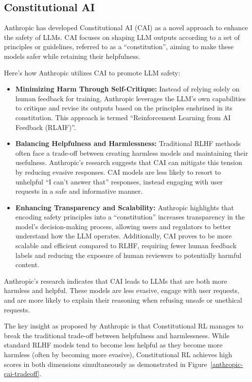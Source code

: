 \subsection{Constitutional AI}

Anthropic has developed Constitutional AI (CAI)  as a novel approach to enhance the safety of LLMs. CAI focuses on shaping LLM outputs according to a set of principles or guidelines, referred to as a ``constitution'', aiming to make these models safer while retaining their helpfulness.

Here's how Anthropic utilizes CAI to promote LLM safety:

\begin{itemize}
    \item \textbf{Minimizing Harm Through Self-Critique:} Instead of relying solely on human feedback for training, Anthropic leverages the LLM's own capabilities to critique and revise its outputs based on the principles enshrined in its constitution. This approach is termed ``Reinforcement Learning from AI Feedback (RLAIF)''.
    
    \item \textbf{Balancing Helpfulness and Harmlessness:} Traditional RLHF methods often face a trade-off between creating harmless models and maintaining their usefulness. Anthropic's research suggests that CAI can mitigate this tension by reducing evasive responses. CAI models are less likely to resort to unhelpful ``I can't answer that'' responses, instead engaging with user requests in a safe and informative manner.
    
    \item \textbf{Enhancing Transparency and Scalability:} Anthropic highlights that encoding safety principles into a ``constitution'' increases transparency in the model's decision-making process, allowing users and regulators to better understand how the LLM operates. Additionally, CAI proves to be more scalable and efficient compared to RLHF, requiring fewer human feedback labels and reducing the exposure of human reviewers to potentially harmful content.
\end{itemize}

Anthropic's research indicates that CAI leads to LLMs that are both more harmless and helpful. These models are less evasive, engage with user requests, and are more likely to explain their reasoning when refusing unsafe or unethical requests.

The key insight as proposed by Anthropic is that Constitutional RL manages to break the traditional trade-off between helpfulness and harmlessness. While standard RLHF models tend to become less helpful as they become more harmless (often by becoming more evasive), Constitutional RL achieves high scores in both dimensions simultaneously as demonstrated in Figure~\ref{anthropic-cai-tradeoff}.


